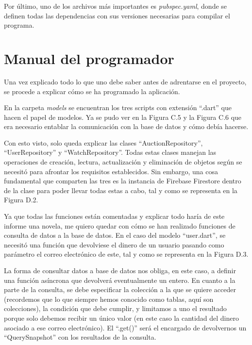 	Por último, uno de los archivos más importantes es \emph{pubspec.yaml}, donde se definen todas las dependencias con sus versiones necesarias para compilar el programa.

\section{Manual del programador}

	Una vez explicado todo lo que uno debe saber antes de adrentarse en el proyecto, se procede a explicar cómo se ha programado la aplicación.
	
	En la carpeta \emph{models} se encuentran los tres scripts con extensión ``.dart'' que hacen el papel de modelos. Ya se pudo ver en la Figura C.5 y la Figura C.6 que era necesario entablar la comunicación con la base de datos y cómo debía hacerse.
	
	Con esto visto, solo queda explicar las clases ``AuctionRepository'', ``UserRepository'' y ``WatchRepository''. Todas estas clases manejan las operaciones de creación, lectura, actualización y eliminación de objetos según se necesitó para afrontar los requisitos establecidos. Sin embargo, una cosa fundamental que comparten las tres es la instancia de Firebase Firestore dentro de la clase para poder llevar todas estas a cabo, tal y como se representa en la Figura D.2.


	Ya que todas las funciones están comentadas y explicar todo haría de este informe una novela, me quiero quedar con cómo se han realizado funciones de consulta de datos a la base de datos. En el caso del modelo ``user.dart'', se necesitó una función que devolviese el dinero de un usuario pasando como parámetro el correo electrónico de este, tal y como se representa en la Figura D.3.
	

	La forma de consultar datos a base de datos nos obliga, en este caso, a definir una función asíncrona que devolverá eventualmente un entero. En cuanto a la parte de la consulta, se debe especificar la colección a la que se quiere acceder (recordemos que lo que siempre hemos conocido como tablas, aquí son colecciones), la condición que debe cumplir, y limitamos a uno el resultado porque solo debemos recibir un único valor (en este caso la cantidad del dinero asociado a ese correo electrónico). El ``.get()'' será el encargado de devolvernos un ``QuerySnapshot'' con los resultados de la consulta. 
	
